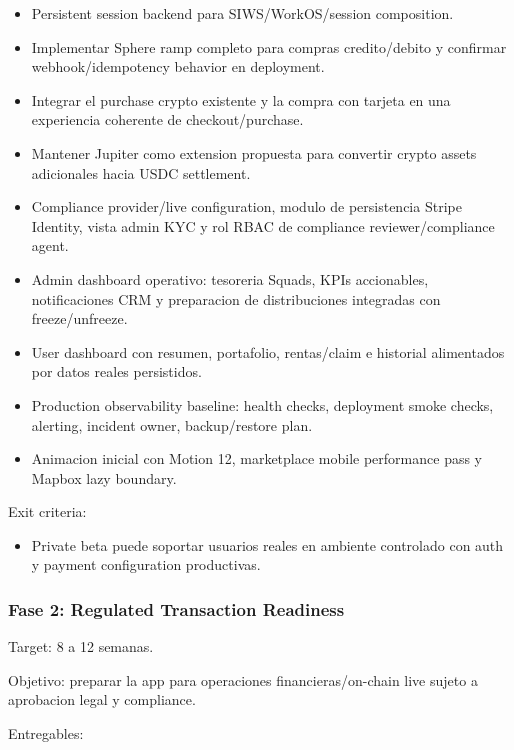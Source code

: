 \documentclass[
  10pt,
  letterpaper,
]{article}
\providecommand{\tightlist}{%
  \setlength{\itemsep}{0pt}\setlength{\parskip}{0pt}}
\begin{document}
\begin{itemize}
\tightlist
\item
  Persistent session backend para SIWS/WorkOS/session composition.
\item
  Implementar Sphere ramp completo para compras credito/debito y
  confirmar webhook/idempotency behavior en deployment.
\item
  Integrar el purchase crypto existente y la compra con tarjeta en una
  experiencia coherente de checkout/purchase.
\item
  Mantener Jupiter como extension propuesta para convertir crypto assets
  adicionales hacia USDC settlement.
\item
  Compliance provider/live configuration, modulo de persistencia Stripe
  Identity, vista admin KYC y rol RBAC de compliance reviewer/compliance
  agent.
\item
  Admin dashboard operativo: tesoreria Squads, KPIs accionables,
  notificaciones CRM y preparacion de distribuciones integradas con
  freeze/unfreeze.
\item
  User dashboard con resumen, portafolio, rentas/claim e historial
  alimentados por datos reales persistidos.
\item
  Production observability baseline: health checks, deployment smoke
  checks, alerting, incident owner, backup/restore plan.
\item
  Animacion inicial con Motion 12, marketplace mobile performance pass y
  Mapbox lazy boundary.
\end{itemize}

Exit criteria:

\begin{itemize}
\tightlist
\item
  Private beta puede soportar usuarios reales en ambiente controlado con
  auth y payment configuration productivas.
\end{itemize}

\subsubsection{Fase 2: Regulated Transaction
Readiness}\label{fase-2-regulated-transaction-readiness}

Target: 8 a 12 semanas.

Objetivo: preparar la app para operaciones financieras/on-chain live
sujeto a aprobacion legal y compliance.

Entregables:
\end{document}
